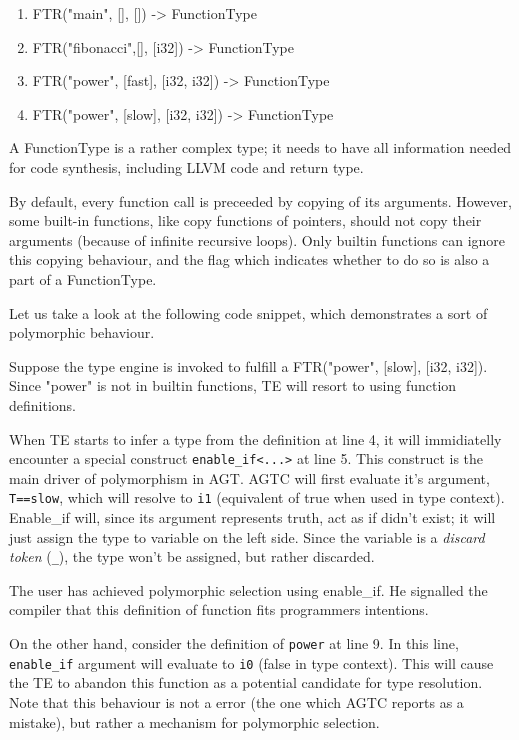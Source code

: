 \documentclass[times, utf8, diplomski]{fer}
\theoremstyle{definition}
\newcommand{\textcode}[3]{
    
}
\begin{document}
\begin{enumerate}
    \item FTR("main", [], []) -> FunctionType
    \item FTR("fibonacci",[], [i32]) -> FunctionType
    \item FTR("power", [fast], [i32, i32]) -> FunctionType
    \item FTR("power", [slow], [i32, i32]) -> FunctionType
\end{enumerate}

A FunctionType is a rather complex type; it needs to have all information needed for code synthesis, 
including LLVM code and return type. 

By default, every function call is preceeded by copying of its arguments. However, some built-in functions,
like copy functions of pointers, should not copy their arguments (because of infinite recursive loops).
Only builtin functions can ignore this copying behaviour, and the flag which indicates
whether to do so is also a part of a FunctionType.

Let us take a look at the following code snippet, which demonstrates a sort of polymorphic behaviour.

\textcode{\resdir/compiler/inf1.agt}{}{a}

Suppose the type engine is invoked to fulfill a FTR("power", [slow], [i32, i32]).
Since "power" is not in builtin functions, TE will resort to using function definitions.

When TE starts to infer a type from the definition at line 4, it will immidiatelly encounter a special
construct \texttt{enable\_if<...>} at line 5. This construct is the main driver of polymorphism in AGT.
AGTC will first evaluate it's argument, \texttt{T==slow}, which will resolve to \texttt{i1} (equivalent of
true when used in type context). Enable\_if will, since its argument represents truth, act as if didn't exist;
it will just assign the type to variable on the left side. Since the variable is a \textit{discard token}
(\texttt{\_}), the type won't be assigned, but rather discarded.

The user has achieved polymorphic selection using enable\_if. He signalled the compiler that this
definition of  function fits programmers intentions.

On the other hand, consider the definition of \texttt{power} at line 9.
In this line, \texttt{enable\_if} argument will evaluate to \texttt{i0} (false in type context).
This will cause the TE to abandon this function as a potential candidate for type resolution.
Note that this behaviour is not a \critical error (the one which AGTC reports as a mistake),
but rather a mechanism for polymorphic selection.
\end{document}
